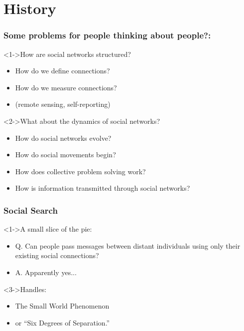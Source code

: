 \section{History}

\begin{frame}
  \frametitle{Some problems for people thinking about people?:}
  
  \begin{block}<1->{How are social networks structured?}
    \begin{itemize}
    \item<1-> How do we define connections?
    \item<1-> How do we measure connections?
    \item<1-> (remote sensing, self-reporting)
    \end{itemize}
  \end{block}

  \begin{block}<2->{What about the dynamics of social networks?}
    \begin{itemize}
    \item<2-> How do social networks evolve? 
    \item<2-> How do social movements begin? 
    \item<2-> How does collective problem solving work? 
    \item<2-> How is information transmitted through social networks?
    \end{itemize}
  \end{block}

\end{frame}

\begin{frame}
  \frametitle{Social Search}

  \begin{block}<1->{A small slice of the pie:}
    \begin{itemize}
    \item<1-> 
      \alert{Q.} Can people pass messages between distant individuals 
      using only their existing social connections?
    \item<2->
      \alert{A.} Apparently yes...
    \end{itemize}
  \end{block}

  \begin{block}<3->{Handles:}
    \begin{itemize}
    \item<4-> 
      The Small World Phenomenon
    \item<5->
      or ``Six Degrees of Separation.''
    \end{itemize}
  \end{block}

\end{frame}


